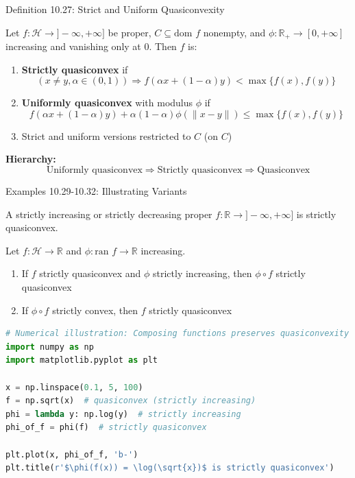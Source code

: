 \documentclass[aspectratio=169,10pt]{beamer}
\begin{document}
\begin{frame}{Definition 10.27: Strict and Uniform Quasiconvexity}
\begin{definition}
Let $f: \mathcal{H} \to ]-\infty, +\infty]$ be proper, $C \subseteq \text{dom } f$ nonempty, and $\phi: \mathbb{R}_+ \to [0, +\infty]$ increasing and vanishing only at 0. Then $f$ is:

\begin{enumerate}
\item \textbf{Strictly quasiconvex} if
\[
(x \neq y, \alpha \in (0,1)) \Rightarrow f(\alpha x + (1-\alpha)y) < \max\{f(x), f(y)\}
\]

\item \textbf{Uniformly quasiconvex} with modulus $\phi$ if
\[
f(\alpha x + (1-\alpha)y) + \alpha(1-\alpha)\phi(\|x-y\|) \leq \max\{f(x), f(y)\}
\]

\item Strict and uniform versions restricted to $C$ (on $C$)
\end{enumerate}
\end{definition}

\textbf{Hierarchy:}
\[
\text{Uniformly quasiconvex} \Rightarrow \text{Strictly quasiconvex} \Rightarrow \text{Quasiconvex}
\]
\end{frame}

\begin{frame}[fragile]{Examples 10.29-10.32: Illustrating Variants}
\begin{example}[10.29]
A strictly increasing or strictly decreasing proper $f: \mathbb{R} \to ]-\infty, +\infty]$ is strictly quasiconvex.
\end{example}

\begin{example}[10.30]
Let $f: \mathcal{H} \to \mathbb{R}$ and $\phi: \text{ran } f \to \mathbb{R}$ increasing.
\begin{enumerate}
\item If $f$ strictly quasiconvex and $\phi$ strictly increasing, then $\phi \circ f$ strictly quasiconvex
\item If $\phi \circ f$ strictly convex, then $f$ strictly quasiconvex
\end{enumerate}
\end{example}

\begin{lstlisting}[language=Python, basicstyle=\ttfamily\tiny]
# Numerical illustration: Composing functions preserves quasiconvexity
import numpy as np
import matplotlib.pyplot as plt

x = np.linspace(0.1, 5, 100)
f = np.sqrt(x)  # quasiconvex (strictly increasing)
phi = lambda y: np.log(y)  # strictly increasing
phi_of_f = phi(f)  # strictly quasiconvex

plt.plot(x, phi_of_f, 'b-')
plt.title(r'$\phi(f(x)) = \log(\sqrt{x})$ is strictly quasiconvex')
\end{lstlisting}

\end{frame}
\end{document}
